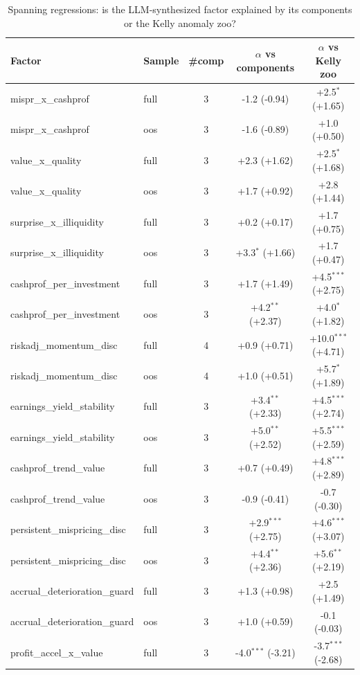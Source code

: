 \begin{table}[htbp]\centering
\caption{Spanning regressions: is the LLM-synthesized factor explained by its components or the Kelly anomaly zoo?}
\label{tab:spanning}
\begin{threeparttable}\footnotesize
\begin{tabular}{llccc}
\toprule
Factor & Sample & \#comp & $\alpha$ vs components & $\alpha$ vs Kelly zoo \\
\midrule
mispr\_x\_cashprof & full & 3 & -1.2 (-0.94) & +2.5$^{*}$ (+1.65) \\
mispr\_x\_cashprof & oos & 3 & -1.6 (-0.89) & +1.0 (+0.50) \\
value\_x\_quality & full & 3 & +2.3 (+1.62) & +2.5$^{*}$ (+1.68) \\
value\_x\_quality & oos & 3 & +1.7 (+0.92) & +2.8 (+1.44) \\
surprise\_x\_illiquidity & full & 3 & +0.2 (+0.17) & +1.7 (+0.75) \\
surprise\_x\_illiquidity & oos & 3 & +3.3$^{*}$ (+1.66) & +1.7 (+0.47) \\
cashprof\_per\_investment & full & 3 & +1.7 (+1.49) & +4.5$^{***}$ (+2.75) \\
cashprof\_per\_investment & oos & 3 & +4.2$^{**}$ (+2.37) & +4.0$^{*}$ (+1.82) \\
riskadj\_momentum\_disc & full & 4 & +0.9 (+0.71) & +10.0$^{***}$ (+4.71) \\
riskadj\_momentum\_disc & oos & 4 & +1.0 (+0.51) & +5.7$^{*}$ (+1.89) \\
earnings\_yield\_stability & full & 3 & +3.4$^{**}$ (+2.33) & +4.5$^{***}$ (+2.74) \\
earnings\_yield\_stability & oos & 3 & +5.0$^{**}$ (+2.52) & +5.5$^{***}$ (+2.59) \\
cashprof\_trend\_value & full & 3 & +0.7 (+0.49) & +4.8$^{***}$ (+2.89) \\
cashprof\_trend\_value & oos & 3 & -0.9 (-0.41) & -0.7 (-0.30) \\
persistent\_mispricing\_disc & full & 3 & +2.9$^{***}$ (+2.75) & +4.6$^{***}$ (+3.07) \\
persistent\_mispricing\_disc & oos & 3 & +4.4$^{**}$ (+2.36) & +5.6$^{**}$ (+2.19) \\
accrual\_deterioration\_guard & full & 3 & +1.3 (+0.98) & +2.5 (+1.49) \\
accrual\_deterioration\_guard & oos & 3 & +1.0 (+0.59) & -0.1 (-0.03) \\
profit\_accel\_x\_value & full & 3 & -4.0$^{***}$ (-3.21) & -3.7$^{***}$ (-2.68) \\

\end{tabular}
\end{threeparttable}
\end{table}
